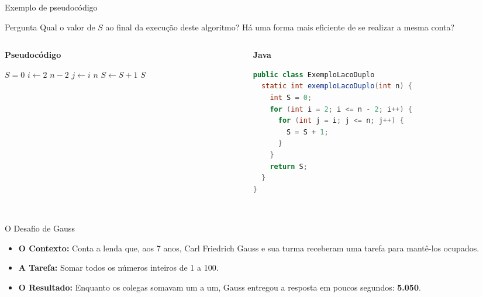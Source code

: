 \documentclass[aspectratio=169]{beamer}
\begin{document}
\begin{frame}{Exemplo de pseudocódigo}
	\begin{block}{Pergunta}
		Qual o valor de $S$ ao final da execução deste algoritmo? Há uma forma mais eficiente de se realizar a mesma conta?
	\end{block}
  \begin{columns}[T]

    \begin{column}{0.45\textwidth}
      \textbf{Pseudocódigo}
      \begin{codebox}
        \li $S = 0$
        \li \For $i \gets 2$ \To $n - 2$
        \li   \Do \For $j \gets i$ \To $n$
        \li     \Do $S \gets S + 1$
                \End
              \End
        \li \Return $S$
      \end{codebox}
    \end{column}

    \begin{column}{0.5\textwidth}
      \textbf{Java}

		    \begin{lstlisting}[language=Java, basicstyle=\ttfamily\tiny]
public class ExemploLacoDuplo 
  static int exemploLacoDuplo(int n) {
    int S = 0;
    for (int i = 2; i <= n - 2; i++) {
      for (int j = i; j <= n; j++) {
        S = S + 1;
      }
    }
    return S;
  }
}
 
\end{lstlisting}

    \end{column}

  \end{columns}
\end{frame}

\begin{frame}{O Desafio de Gauss}
    \begin{itemize}
        \item \textbf{O Contexto:} Conta a lenda que, aos 7 anos, Carl Friedrich Gauss e sua turma receberam uma tarefa para mantê-los ocupados.
        \item \textbf{A Tarefa:} Somar todos os números inteiros de 1 a 100.
        \item \textbf{O Resultado:} Enquanto os colegas somavam um a um, Gauss entregou a resposta em poucos segundos: \textbf{5.050}.
    \end{itemize}
\end{frame}
\end{document}
